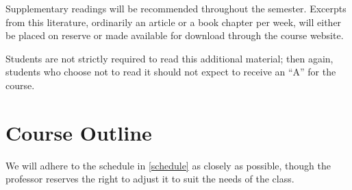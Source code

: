 \documentclass[titlepage]{article}
\begin{document}
Supplementary readings will be recommended throughout the semester.
Excerpts from this literature, ordinarily an article or a book chapter
per week, will either be placed on reserve or made available for
download through the course website.

Students are not strictly required to read this additional material;
then again, students who choose not to read it should not expect to
receive an ``A'' for the course.

\section{Course Outline}
\label{outline}

We will adhere to the schedule in \autoref{schedule} as closely as
possible, though the professor reserves the right to adjust it to suit
the needs of the class.

\newcommand\HBFB[1]{\cite[#1]{hbfb}}
\end{document}
